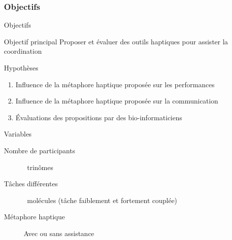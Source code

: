 \documentclass[english,french,dvips,10pt]{mybeamer}
\begin{document}
	\subsubsection{Objectifs}
	\begin{myframe}{Objectifs}
		\begin{myblock}{Objectif principal}
			Proposer et évaluer des outils haptiques pour assister la coordination
		\end{myblock}
		\begin{myplusblock}{Hypothèses}
			\begin{enumerate}
				\item Influence de la métaphore haptique proposée sur les performances
				\item Influence de la métaphore haptique proposée sur la communication
				\item Évaluations des propositions par des bio-informaticiens
			\end{enumerate}
		\end{myplusblock}
		\begin{myblock}{Variables}
			\begin{description}
				\item[Nombre de participants] ~trinômes
				\item[Tâches différentes] ~molécules (tâche faiblement et fortement couplée)
				\item[Métaphore haptique] Avec ou sans assistance
			\end{description}
		\end{myblock}
	\end{myframe}
\end{document}
